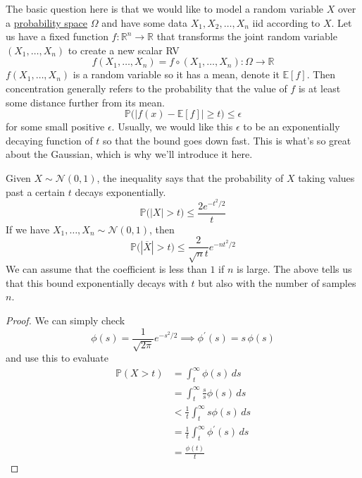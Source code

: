   The basic question here is that we would like to model a random variable $X$ over a \hyperref[def:probability-space]{probability space} $\Omega$ and have some data $X_1, X_2, \ldots, X_n$ iid according to $X$. Let us have a fixed function $f: \mathbb{R}^n \to \mathbb{R}$ that transforms the joint random variable $(X_1, \ldots, X_n)$ to create a new scalar RV 
  \begin{equation}
    f(X_1, \ldots, X_n) = f \circ (X_1, \ldots, X_n) : \Omega \to \mathbb{R}
  \end{equation}
  $f(X_1, \ldots, X_n)$ is a random variable so it has a mean, denote it $\mathbb{E}[f]$. Then concentration generally refers to the probability that the value of $f$ is at least some distance further from its mean. 
  \begin{equation}
    \mathbb{P} \big( |f(x) - \mathbb{E}[f] | \geq t \big) \leq \epsilon
  \end{equation}
  for some small positive $\epsilon$. Usually, we would like this $\epsilon$ to be an exponentially decaying function of $t$ so that the bound goes down fast. This is what's so great about the Gaussian, which is why we'll introduce it here. 

  \begin{theorem}
    \label{thm:gaussian-tail-inequality}
    Given $X \sim \mathcal{N}(0, 1)$, the inequality says that the probability of $X$ taking values past a certain $t$ decays exponentially. 
    \begin{equation}
      \mathbb{P} \big( |X| > t \big) \leq \frac{2 e^{-t^2/2}}{t}
    \end{equation}
    If we have $X_1, \ldots, X_n \sim \mathcal{N}(0, 1)$, then 
    \begin{equation}
      \mathbb{P} \big( |\overline{X}| > t \big) \leq \frac{2}{\sqrt{n} t} e^{-n t^2/2}
    \end{equation}
    We can assume that the coefficient is less than $1$ if $n$ is large. The above tells us that this bound exponentially decays with $t$ but also with the number of samples $n$. 
  \end{theorem}
  \begin{proof}
    We can simply check 
    \begin{equation}
      \phi(s) = \frac{1}{\sqrt{2\pi}} e^{-s^2/2} \implies \phi^\prime (s) = s \, \phi(s)
    \end{equation}
    and use this to evaluate
    \begin{align*}
      \mathbb{P}(X > t ) & = \int_t^\infty \phi(s) \,ds \\
      & = \int_t^\infty \frac{s}{s} \phi(s) \,ds \\
      & < \frac{1}{t} \int_t^\infty s \phi(s)\,ds \\
      & = \frac{1}{t} \int_t^\infty \phi^\prime (s)\,ds \\
      & = \frac{\phi(t)}{t}
    \end{align*}
  \end{proof}


